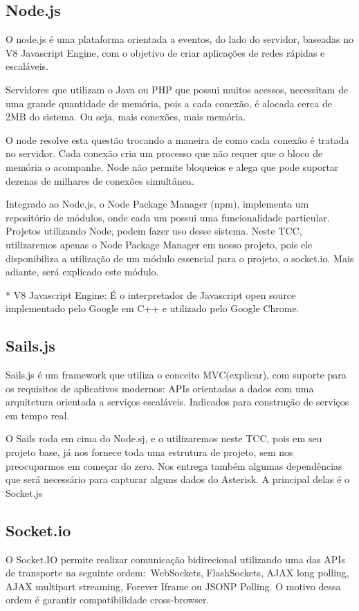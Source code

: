 \documentclass[ruledheader]{abnt} %
\begin{document}
\subsection{Node.js}
O node.js é uma plataforma orientada a eventos, do lado do servidor, baseadas no V8 Javascript Engine, com o objetivo de criar aplicações de redes rápidas e escaláveis. 

Servidores que utilizam o Java ou PHP que possui muitos acessos, necessitam de uma grande quantidade de memória, pois a cada conexão, é alocada cerca de 2MB do sistema. Ou seja, mais conexões, mais memória. 

O node resolve esta questão trocando a maneira de como cada conexão é tratada no servidor. Cada conexão cria um processo que não requer que o bloco de memória o acompanhe. Node não permite bloqueios e alega que pode suportar dezenas de milhares de conexões simultânea.

Integrado ao Node.js, o Node Package Manager (npm), implementa um repositório de módulos, onde cada um possui uma funcionalidade particular.  Projetos utilizando Node, podem fazer uso desse sistema.
Neste TCC, utilizaremos apenas o Node Package Manager em nosso projeto, pois ele disponibiliza a utilização de um módulo essencial para o projeto, o socket.io. Mais adiante, será explicado este módulo. 

* V8 Javascript Engine: É o interpretador de Javascript open source implementado pelo Google em C++ e utilizado pelo Google Chrome.

\subsection{Sails.js}
Sails.js é um framework que utiliza o conceito MVC(explicar), com suporte para os requisitos de aplicativos modernos: APIs orientadas a dados com uma arquitetura orientada a serviços escaláveis. Indicados para construção de serviços em tempo real. 

O Sails roda em cima do Node.sj, e o utilizaremos neste TCC, pois em seu projeto base, já nos fornece toda uma estrutura de projeto, sem nos preocuparmos em começar do zero. Nos entrega também algumas dependências que será necessário para capturar alguns dados do Asterisk. A principal delas é o Socket.js 

\subsection{Socket.io}
O Socket.IO permite realizar comunicação bidirecional utilizando uma das APIs de transporte na seguinte ordem: WebSockets, FlashSockets, AJAX long polling, AJAX multipart streaming, Forever Iframe ou JSONP Polling. O motivo dessa ordem é garantir compatibilidade cross-browser.
\end{document}
